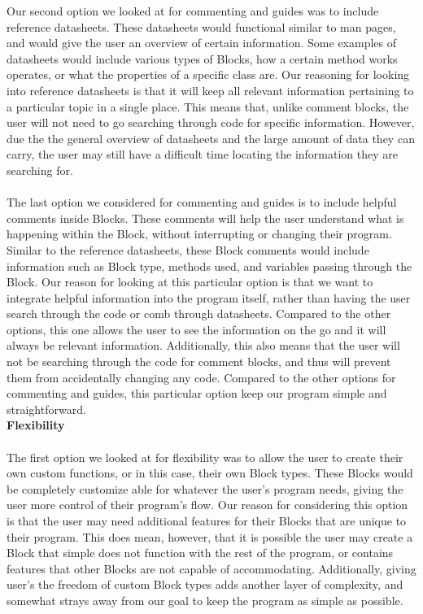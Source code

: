 \documentclass[journal,10pt,onecolumn,compsoc]{IEEEtran} \usepackage[margin=1.0in]{geometry} \usepackage{pdfpages} \usepackage{graphicx}
\begin{document}
\indent Our second option we looked at for commenting and guides was to include reference datasheets. These datasheets would functional similar to man pages, and would give the user an overview of certain information. Some examples of datasheets would include various types of Blocks, how a certain method works operates, or what the properties of a specific class are. Our reasoning for looking into reference datasheets is that it will keep all relevant information pertaining to a particular topic in a single place. This means that, unlike comment blocks, the user will not need to go searching through code for specific information. However, due the the general overview of datasheets and the large amount of data they can carry, the user may still have a difficult time locating the information they are searching for.
\\
\\
\indent The last option we considered for commenting and guides is to include helpful comments inside Blocks. These comments will help the user understand what is happening within the Block, without interrupting or changing their program. Similar to the reference datasheets, these Block comments would include information such as Block type, methods used, and variables passing through the Block. Our reason for looking at this particular option is that we want to integrate helpful information into the program itself, rather than having the user search through the code or comb through datasheets. Compared to the other options, this one allows the user to see the information on the go and it will always be relevant information. Additionally, this also means that the user will not be searching through the code for comment blocks, and thus will prevent them from accidentally changing any code. Compared to the other options for commenting and guides, this particular option keep our program simple and straightforward.
\\
\newpage
\noindent \textbf{Flexibility}
\\
\\
\indent The first option we looked at for flexibility was to allow the user to create their own custom functions, or in this case, their own Block types. These Blocks would be completely customize able for whatever the user's program needs, giving the user more control of their program's flow. Our reason for considering this option is that the user may need additional features for their Blocks that are unique to their program. This does mean, however, that it is possible the user may create a Block that simple does not function with the rest of the program, or contains features that other Blocks are not capable of accommodating. Additionally, giving user's the freedom of custom Block types adds another layer of complexity, and somewhat strays away from our goal to keep the program as simple as possible.
\end{document}
